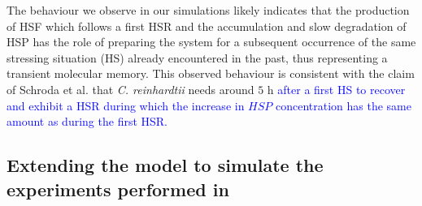 \documentclass[oneside, 10pt, a4paper, twocolumn]{article}
\begin{document}
The behaviour we observe in our simulations likely indicates that the production of HSF which follows a first HSR and the accumulation and slow degradation of HSP has the role of preparing the system for a subsequent occurrence of the same stressing situation (HS) already encountered in the past, thus representing a transient molecular memory. 
This observed behaviour is consistent with the claim of Schroda et al. \cite{Schroda2000} that \emph{C. reinhardtii} needs around $5$ h \textcolor{blue}{after a first HS to recover and exhibit a HSR during which the increase in $HSP$ concentration has the same amount as during the first HSR.} %







\subsection{Extending the model to simulate the experiments performed in \cite{Schroda2000}}
\label{SecARSSM}
\end{document}
